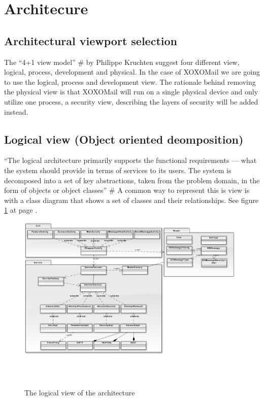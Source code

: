 \section{Architecure}

\subsection{Architectural viewport selection}
The “4+1 view model” \# by Philippe Kruchten suggest four different view, logical, process, development and physical. In the case of XOXOMail we are going to use the logical, process and development view. The rationale behind removing the physical view is that XOXOMail will run on a single physical device and only utilize one process, a security view, describing the layers of security will be added instead.

\subsection{Logical view (Object oriented deomposition)}
“The logical architecture primarily supports the functional requirements --- what the system should provide in terms of services to its users. The system is decomposed into a set of key abstractions, taken from the problem domain, in the form of objects or object classes” \# A common way to represent this is view is with a class diagram that shows a set of classes and their relationships.
See figure \ref{fig:logicalview} at page \pageref{fig:logicalview}.

\begin{figure}
	\includegraphics[width=\textwidth]{logicalview.png}
	\caption{The logical view of the architecture}
	\label{fig:logicalview}
\end{figure}


